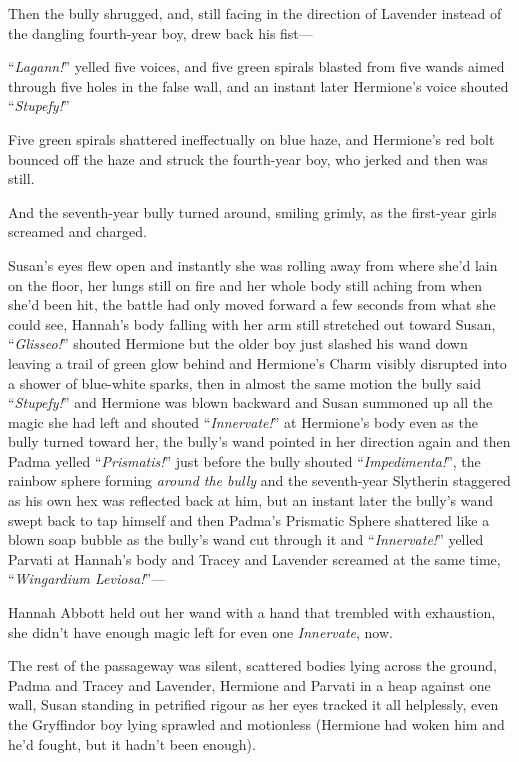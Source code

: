 Then the bully shrugged, and, still facing in the direction of Lavender instead of the dangling fourth-year boy, drew back his fist—

“\emph{Lagann!}” yelled five voices, and five green spirals blasted from five wands aimed through five holes in the false wall, and an instant later Hermione’s voice shouted “\emph{Stupefy!}”

Five green spirals shattered ineffectually on blue haze, and Hermione’s red bolt bounced off the haze and struck the fourth-year boy, who jerked and then was still.

And the seventh-year bully turned around, smiling grimly, as the first-year girls screamed and charged.

\later

Susan’s eyes flew open and instantly she was rolling away from where she’d lain on the floor, her lungs still on fire and her whole body still aching from when she’d been hit, the battle had only moved forward a few seconds from what she could see, Hannah’s body falling with her arm still stretched out toward Susan, “\emph{Glisseo!}” shouted Hermione but the older boy just slashed his wand down leaving a trail of green glow behind and Hermione’s Charm visibly disrupted into a shower of blue-white sparks, then in almost the same motion the bully said “\emph{Stupefy!}” and Hermione was blown backward and Susan summoned up all the magic she had left and shouted “\emph{Innervate!}” at Hermione’s body even as the bully turned toward her, the bully’s wand pointed in her direction again and then Padma yelled “\emph{Prismatis!}” just before the bully shouted “\emph{Impedimenta!}”, the rainbow sphere forming \emph{around the bully} and the seventh-year Slytherin staggered as his own hex was reflected back at him, but an instant later the bully’s wand swept back to tap himself and then Padma’s Prismatic Sphere shattered like a blown soap bubble as the bully’s wand cut through it and “\emph{Innervate!}” yelled Parvati at Hannah’s body and Tracey and Lavender screamed at the same time, “\emph{Wingardium Leviosa!}”—

\later

Hannah Abbott held out her wand with a hand that trembled with exhaustion, she didn’t have enough magic left for even one \emph{Innervate}, now.

The rest of the passageway was silent, scattered bodies lying across the ground, Padma and Tracey and Lavender, Hermione and Parvati in a heap against one wall, Susan standing in petrified rigour as her eyes tracked it all helplessly, even the Gryffindor boy lying sprawled and motionless (Hermione had woken him and he’d fought, but it hadn’t been enough).


